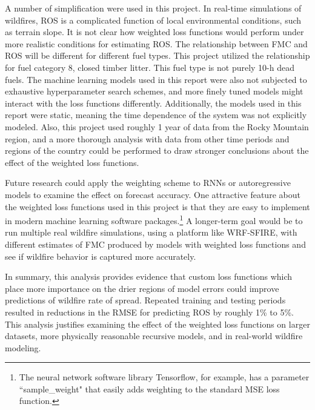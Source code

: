 \documentclass[11pt]{article}%
\begin{document}
A number of simplification were used in this project. In real-time simulations of wildfires, ROS is a complicated function of local environmental conditions, such as terrain slope. It is not clear how weighted loss functions would perform under more realistic conditions for estimating ROS. The relationship between FMC and ROS will be different for different fuel types. This project utilized the relationship for fuel category 8, closed timber litter. This fuel type is not purely 10-h dead fuels. The machine learning models used in this report were also not subjected to exhaustive hyperparameter search schemes, and more finely tuned models might interact with the loss functions differently. Additionally, the models used in this report were static, meaning the time dependence of the system was not explicitly modeled. Also, this project used roughly 1 year of data from the Rocky Mountain region, and a more thorough analysis with data from other time periods and regions of the country could be performed to draw stronger conclusions about the effect of the weighted loss functions.

Future research could apply the weighting scheme to RNNs or autoregressive models to examine the effect on forecast accuracy. One attractive feature about the weighted loss functions used in this project is that they are easy to implement in modern machine learning software packages.\footnote{The neural network software library Tensorflow, for example, has a parameter ``sample\_weight" that easily adds weighting to the standard MSE loss function.} A longer-term goal would be to run multiple real wildfire simulations, using a platform like WRF-SFIRE, with different estimates of FMC produced by models with weighted loss functions and see if wildfire behavior is captured more accurately.

In summary, this analysis provides evidence that custom loss functions which place more importance on the drier regions of model errors could improve predictions of wildfire rate of spread. Repeated training and testing periods resulted in reductions in the RMSE for predicting ROS by roughly 1\% to 5\%. This analysis justifies examining the effect of the weighted loss functions on larger datasets, more physically reasonable recursive models, and in real-world wildfire modeling.

\newpage
% 

\begingroup
\raggedright


\endgroup
\end{document}
